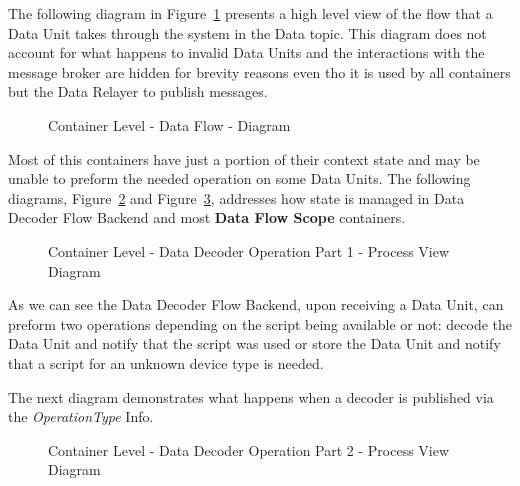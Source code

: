 The following diagram in Figure~\ref{fig:design:architecture:container:process:diagram:flow} presents a high level view of the flow that a Data Unit takes through the system in the Data topic. This diagram does not account for what happens to invalid Data Units and the interactions with the message broker are hidden for brevity reasons even tho it is used by all containers but the Data Relayer to publish messages.

\begin{figure}[H]
   \centering
   \resizebox{\columnwidth}{!}
   {      
      
   }
   \caption[Container Level - Data Flow - Diagram]{Container Level - Data Flow - Diagram}
   \label{fig:design:architecture:container:process:diagram:flow}
\end{figure}

Most of this containers have just a portion of their context state and may be unable to preform the needed operation on some Data Units. The following diagrams, Figure~\ref{fig:design:architecture:container:process:diagram:decoder:1} and Figure~\ref{fig:design:architecture:container:process:diagram:decoder:2}, addresses how state is managed in Data Decoder Flow Backend and most \textbf{Data Flow Scope} containers.

\begin{figure}[H]
   \centering
   \resizebox{\columnwidth}{!}
   {      
      
   }
   \caption[Container Level - Data Decoder Operation part 1 - Process View Diagram]{Container Level - Data Decoder Operation Part 1 - Process View Diagram}
   \label{fig:design:architecture:container:process:diagram:decoder:1}
\end{figure}

As we can see the Data Decoder Flow Backend, upon receiving a Data Unit, can preform two operations depending on the script being available or not: decode the Data Unit and notify that the script was used or store the Data Unit and notify that a script for an unknown device type is needed.

The next diagram demonstrates what happens when a decoder is published via the \textit{OperationType} Info.

\begin{figure}[H]
   \centering
   \resizebox{\columnwidth}{!}
   {      
      
   }
   \caption[Container Level - Data Decoder Operation Part 2 - Process View Diagram]{Container Level - Data Decoder Operation Part 2 - Process View Diagram}
   \label{fig:design:architecture:container:process:diagram:decoder:2}
\end{figure}

